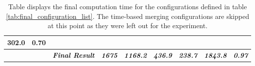 \begin{table}[H]
{\begin{tabular}{ccccrrrrc}
    \multicolumn{1}{r|}{{\color[HTML]{000000} 302.0}} &
    \multicolumn{1}{c|}{0.70} \\ \hline
   &
    \multicolumn{1}{c|}{} &
    \multicolumn{1}{c|}{\textit{\textbf{Final Result}}} &
    \multicolumn{1}{c|}{\textit{\textbf{1675}}} &
    \multicolumn{1}{r|}{{\color[HTML]{000000} \textit{\textbf{1168.2}}}} &
    \multicolumn{1}{r|}{{\color[HTML]{000000} \textit{\textbf{436.9}}}} &
    \multicolumn{1}{r|}{{\color[HTML]{000000} \textit{\textbf{238.7}}}} &
    \multicolumn{1}{r|}{{\color[HTML]{000000} \textit{\textbf{1843.8}}}} &
    \multicolumn{1}{c|}{\textit{\textbf{0.97}}} \\ \cline{3-9} 
  \end{tabular}%
  }
  \caption[Computation time]{Table displays the final computation time for the configurations defined in table \ref{tab:final_configuration_list}. The time-based merging configurations are skipped at this point as they were left out for the experiment.}
  \label{tab:computation_time}
  \end{table}